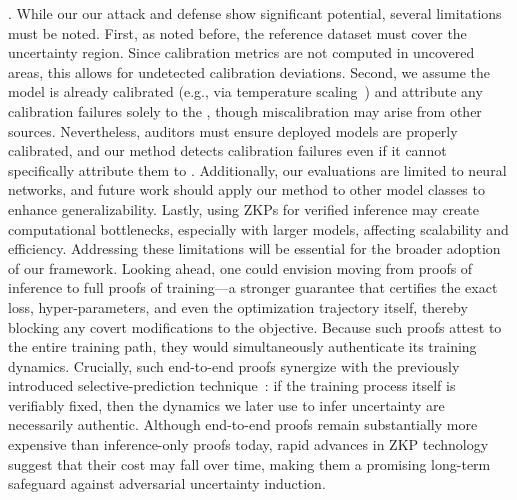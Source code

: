 . While our our attack and defense show significant potential, several limitations must be noted. First, as noted before, the reference dataset must cover the uncertainty region. Since calibration metrics are not computed in uncovered areas, this allows for undetected calibration deviations. Second, we assume the model is already calibrated (e.g., via temperature scaling~\citep{guo2017calibration}) and attribute any calibration failures solely to the \attack, though miscalibration may arise from other sources. Nevertheless, auditors must ensure deployed models are properly calibrated, and our method detects calibration failures even if it cannot specifically attribute them to \attack. Additionally, our evaluations are limited to neural networks, and future work should apply our method to other model classes to enhance generalizability. Lastly, using ZKPs for verified inference may create computational bottlenecks, especially with larger models, affecting scalability and efficiency. Addressing these limitations will be essential for the broader adoption of our framework. Looking ahead, one could envision moving from proofs of inference to full proofs of training---a stronger guarantee that certifies the exact loss, hyper-parameters, and even the optimization trajectory itself, thereby blocking any covert modifications to the objective. Because such proofs attest to the entire training path, they would simultaneously authenticate its training dynamics. Crucially, such end-to-end proofs synergize with the previously introduced selective-prediction technique~\citep{rabanser2022selective}: if the training process itself is verifiably fixed, then the dynamics we later use to infer uncertainty are necessarily authentic. Although end-to-end proofs remain substantially more expensive than inference-only proofs today, rapid advances in ZKP technology suggest that their cost may fall over time, making them a promising long-term safeguard against adversarial uncertainty induction.



